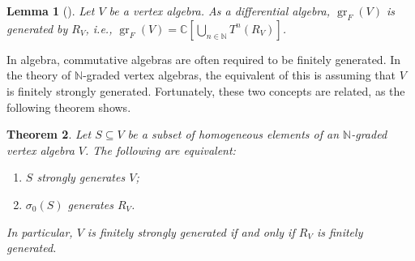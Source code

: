 \documentclass[a4paper, 12pt, reqno]{amsart}
\newtheorem{theorem}{Theorem}[section]
\newtheorem{lemma}[theorem]{Lemma}
\theoremstyle{remark}
\numberwithin{equation}{subsection}
\DeclareMathOperator{\gr}{gr}
\begin{document}
\begin{lemma}[{\cite[Lemma 4.2]{li_abelianizing_2005}}]
  \label{lmm:23}
  Let $V$ be a vertex algebra.
  As a differential algebra, $\gr_F(V)$ is generated by $R_V$, i.e., $\gr_F(V) = \mathbb{C}\left[\bigcup_{n \in \mathbb{N}}T^n(R_V)\right]$.
\end{lemma}

In algebra, commutative algebras are often required to be finitely generated.
In the theory of $\mathbb{N}$-graded vertex algebras, the equivalent of this is assuming that $V$ is finitely strongly generated.
Fortunately, these two concepts are related, as the following theorem shows.

\begin{theorem}
  \label{thr:49}
  Let $S \subseteq V$ be a subset of homogeneous elements of an $\mathbb{N}$-graded vertex algebra $V$.
  The following are equivalent:
  \begin{enumerate}
  \item $S$ strongly generates $V$;
  \item $\sigma_0(S)$ generates $R_V$.
  \end{enumerate}
  In particular, $V$ is finitely strongly generated if and only if $R_V$ is finitely generated.
\end{theorem}
\end{document}
